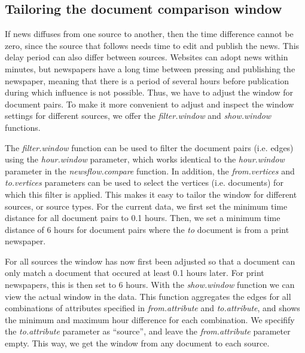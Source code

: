 \subsection{Tailoring the document comparison window}

If news diffuses from one source to another, then the time difference cannot be zero, since the source that follows needs time to edit and publish the news. 
This delay period can also differ between sources.
Websites can adopt news within minutes, but newspapers have a long time between pressing and publishing the newspaper, meaning that there is a period of several hours before publication during which influence is not possible.
Thus, we have to adjust the window for document pairs. 
To make it more convenient to adjust and inspect the window settings for different sources, we offer the \emph{filter.window} and \emph{show.window} functions.

The \emph{filter.window} function can be used to filter the document pairs (i.e. edges) using the \emph{hour.window} parameter, which works identical to the \emph{hour.window} parameter in the \emph{newsflow.compare} function. 
In addition, the \emph{from.vertices} and \emph{to.vertices} parameters can be used to select the vertices (i.e. documents) for which this filter is applied.
This makes it easy to tailor the window for different sources, or source types.
For the current data, we first set the minimum time distance for all document pairs to 0.1 hours. 
Then, we set a minimum time distance of 6 hours for document pairs where the \emph{to} document is from a print newspaper.

\begin{Schunk}
\end{Schunk}

For all sources the window has now first been adjusted so that a
document can only match a document that occured at least 0.1 hours
later. For print newspapers, this is then set to 6 hours. With the
\emph{show.window} function we can view the actual window in the data.
This function aggregates the edges for all combinations of attributes
specified in \emph{from.attribute} and \emph{to.attribute}, and shows
the minimum and maximum hour difference for each combination. We
specifify the \emph{to.attribute} parameter as ``source'', and leave the
\emph{from.attribute} parameter empty. This way, we get the window from
any document to each source.

